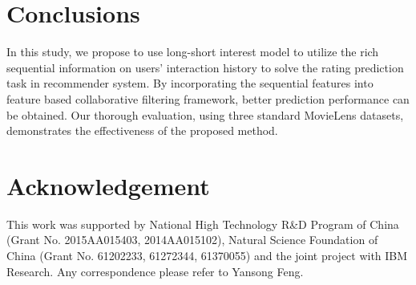\documentclass{llncs}
\begin{document}
\section{Conclusions}
In this study, we propose to use long-short interest model to utilize the rich
sequential information on users' interaction history to solve the rating
prediction task in recommender system.
By incorporating the sequential features into feature based collaborative
filtering framework, better prediction performance can be obtained.
Our thorough evaluation, using three standard MovieLens datasets, demonstrates
the effectiveness of the proposed method.

\section*{Acknowledgement}
This work was supported by National High Technology R\&D Program of China (Grant No. 2015AA015403, 2014AA015102),
Natural Science Foundation of China (Grant No. 61202233, 61272344, 61370055) and the joint project with IBM Research.
Any correspondence please refer to Yansong Feng.



\end{document}
